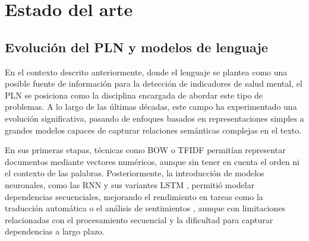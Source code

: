 %
%
%
% 
%
%
%
%

\chapter{Estado del arte}
\label{cha:estado-del-arte}

\section{Evolución del PLN y modelos de lenguaje}

En el contexto descrito anteriormente, donde el lenguaje se plantea como una posible fuente de información para la detección de indicadores de salud mental, el \ac{PLN} se posiciona como la disciplina encargada de abordar este tipo de problemas. A lo largo de las últimas décadas, este campo ha experimentado una evolución significativa, pasando de enfoques basados en representaciones simples a grandes modelos capaces de capturar relaciones semánticas complejas en el texto.

En sus primeras etapas, técnicas como \ac{BOW} \cite{harris_distributional_1954} o \ac{TFIDF} \cite{sparck_jones_statistical_1972} permitían representar documentos mediante vectores numéricos, aunque sin tener en cuenta el orden ni el contexto de las palabras. Posteriormente, la introducción de modelos neuronales, como las \ac{RNN} \cite{rumelhart_learning_1986} y sus variantes \ac{LSTM} \cite{hochreiter_long_1997}, permitió modelar dependencias secuenciales, mejorando el rendimiento en tareas como la traducción automática o el análisis de sentimientos \cite{socher_recursive_2013}, aunque con limitaciones relacionadas con el procesamiento secuencial y la dificultad para capturar dependencias a largo plazo.

